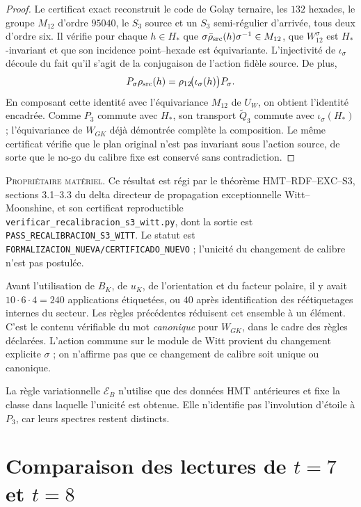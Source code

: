 \begin{proof}
Le certificat exact reconstruit le code de Golay ternaire, les \(132\)
hexades, le groupe \(M_{12}\) d'ordre \(95040\), le \(S_3\) source et un
\(S_3\) semi-régulier d'arrivée, tous deux d'ordre six. Il vérifie pour chaque
\(h\in H_*\) que
\(
\sigma\bar\rho_{\rm src}(h)\sigma^{-1}\in M_{12}
\), que \(W_{12}^{\sigma}\) est \(H_*\)-invariant et que son incidence
point--hexade est équivariante. L'injectivité de \(\iota_\sigma\) découle
du fait qu'il s'agit de la conjugaison de l'action fidèle source. De plus,
\[
 P_\sigma\rho_{\rm src}(h)
 =\rho_{12}\!\bigl(\iota_\sigma(h)\bigr)P_\sigma.
\]
En composant cette identité avec l'équivariance \(M_{12}\) de \(U_W\), on
obtient l'identité encadrée. Comme \(P_3\) commute avec \(H_*\), son
transport \(\widetilde Q_3\) commute avec \(\iota_\sigma(H_*)\) ;
l'équivariance de \(W_{GK}\) déjà démontrée complète la composition. Le même
certificat vérifie que le plan original n'est pas invariant sous l'action
source, de sorte que le no-go du calibre fixe est conservé sans contradiction.
\end{proof}

\textsc{Propriétaire matériel.} Ce résultat est régi par le théorème
\textsc{HMT--RDF--EXC--S3}, sections 3.1--3.3 du delta directeur de propagation
exceptionnelle Witt--Moonshine, et son certificat reproductible
\texttt{verificar\_recalibracion\_s3\_witt.py}, dont la sortie est
\texttt{PASS\_RECALIBRACION\_S3\_WITT}. Le statut est
\texttt{FORMALIZACION\_NUEVA/CERTIFICADO\_NUEVO} ; l'unicité du
changement de calibre n'est pas postulée.

Avant l'utilisation de \(B_K\), de \(u_K\), de l'orientation et du facteur polaire, il y avait
\(10\cdot6\cdot4=240\) applications étiquetées, ou \(40\) après identification des
réétiquetages internes du secteur. Les règles précédentes réduisent cet
ensemble à un élément. C'est le contenu vérifiable du mot
\emph{canonique} pour \(W_{GK}\), dans le cadre des règles déclarées. L'action
commune sur le module de Witt provient du changement explicite \(\sigma\) ; on
n'affirme pas que ce changement de calibre soit unique ou canonique.

La règle variationnelle \(\mathcal E_B\) n'utilise que des données HMT antérieures
et fixe la classe dans laquelle l'unicité est obtenue. Elle n'identifie pas l'involution
d'étoile à \(P_3\), car leurs spectres restent distincts.

\section{Comparaison des lectures de \texorpdfstring{\(t=7\) et \(t=8\)}{t=7 et t=8}}

